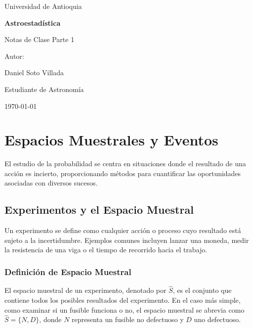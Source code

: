 \documentclass[a4paper]{article}
\begin{document}
\begin{titlepage}
  \centering
  {\Large Universidad de Antioquia\par}
  \vspace{2cm}
  {\huge\bfseries Astroestadística\par}
  \vspace{0.4cm}
  {\Large Notas de Clase Parte 1\par}
  \vspace{2.5cm}
  {\large Autor:\par}
  \vspace{0.2cm}
  {\large Daniel Soto Villada\par}
  {\large Estudiante de Astronomía\par}
  \vfill
  {\large \today\par}
\end{titlepage}

\newpage
\tableofcontents
\newpage

\section{Espacios Muestrales y Eventos}

El estudio de la probabilidad se centra en situaciones donde el resultado de una acción es incierto, proporcionando métodos para cuantificar las oportunidades asociadas con diversos sucesos.

\subsection{Experimentos y el Espacio Muestral}

Un experimento se define como cualquier acción o proceso cuyo resultado está sujeto a la incertidumbre. Ejemplos comunes incluyen lanzar una moneda, medir la resistencia de una viga o el tiempo de recorrido hacia el trabajo.

\subsubsection{Definición de Espacio Muestral}

El espacio muestral de un experimento, denotado por $\hat{S}$, es el conjunto que contiene todos los posibles resultados del experimento. En el caso más simple, como examinar si un fusible funciona o no, el espacio muestral se abrevia como $\hat{S} = \{N, D\}$, donde $N$ representa un fusible no defectuoso y $D$ uno defectuoso.
\end{document}
